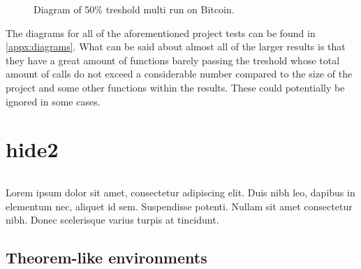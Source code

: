 \begin{figure}[H]
	\caption{Diagram of 50\% treshold multi run on Bitcoin.}
	\label{fig:bc_50_multi}
\end{figure}

The diagrams for all of the aforementioned project tests can be found in \cref{appx:diagrams}.
What can be said about almost all of the larger results is that they have a great amount of functions barely passing the treshold whose total
amount of calls do not exceed a considerable number compared to the size of the project and some other functions within the results. These could
potentially be ignored in some cases.











\iffalse
\chapter{hide2}

\begin{lstlisting}[language={C++},caption={},label={}]

\end{lstlisting}


Lorem ipsum dolor sit amet, consectetur adipiscing elit. Duis nibh leo, dapibus in elementum nec, aliquet id sem. Suspendisse potenti.
 Nullam sit amet consectetur nibh. Donec scelerisque varius turpis at tincidunt.

\section{Theorem-like environments}

